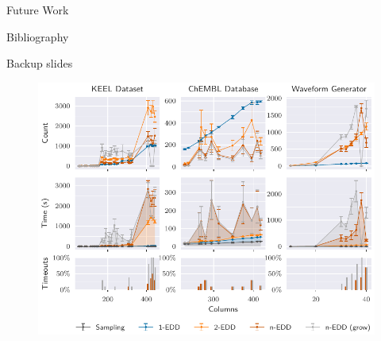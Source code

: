 \documentclass[10pt]{beamer}
\begin{document}
\begin{frame}{Future Work}
\end{frame}



\begin{frame}[allowframebreaks]{Bibliography}
\printbibliography[]
\end{frame}

\appendix

{
\begin{frame}[standout]
  Backup slides
\end{frame}
}


\begin{frame}{}
\begin{figure}
    \centering
    \includegraphics[width=\textwidth]{scalability.pdf}
\end{figure}
\end{frame}
\end{document}
